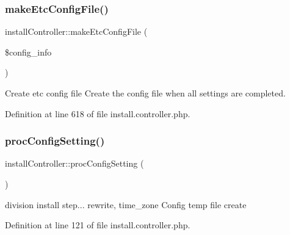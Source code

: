 \mbox{\label{classinstallController_a87b331e263614e15c5366284648f6ee0}} 
\subsubsection{\texorpdfstring{make\+Etc\+Config\+File()}{makeEtcConfigFile()}}
{\footnotesize\ttfamily install\+Controller\+::make\+Etc\+Config\+File (\begin{DoxyParamCaption}\item[{}]{\$config\+\_\+info }\end{DoxyParamCaption})}



Create etc config file Create the config file when all settings are completed. 



Definition at line 618 of file install.\+controller.\+php.

\mbox{\label{classinstallController_a070de62caeaa36e7bfa2b50be905cfde}} 
\subsubsection{\texorpdfstring{proc\+Config\+Setting()}{procConfigSetting()}}
{\footnotesize\ttfamily install\+Controller\+::proc\+Config\+Setting (\begin{DoxyParamCaption}{ }\end{DoxyParamCaption})}



division install step... rewrite, time\+\_\+zone Config temp file create 



Definition at line 121 of file install.\+controller.\+php.

\mbox{\label{classinstallController_a275ce5057c0171e2582739506cec99cb}} 
